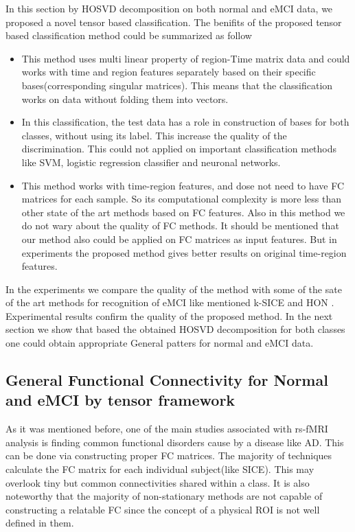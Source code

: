 \documentclass[preprint,12pt]{elsarticle}
\begin{document}
In this section by HOSVD decomposition on both normal and eMCI data, we proposed a novel tensor based classification. The benifits of the proposed tensor based classification method could be summarized as follow
\begin{itemize}
	\item This method  uses multi linear property of region-Time matrix data and  could works with time and region features separately based on their specific bases(corresponding singular matrices). This means that the classification works on data without folding them into vectors.
	\item  In this classification,  the test data has a role in construction of bases for both classes, without using its label. This  increase the quality of the discrimination. This could not applied on important classification methods like SVM, logistic regression classifier and neuronal networks. 
	\item This method works with time-region features, and dose not need to have FC matrices for each sample. So
	its computational complexity is more less than other state of the art methods  based on FC features. Also in this method we do not wary about the quality of FC methods.	
	It should be mentioned that our method also could be applied on FC matrices as input features. But in experiments the proposed method gives better results on original time-region features.  
\end{itemize}
In the experiments we compare the quality of the method with some of the sate of the art methods for recognition of eMCI like mentioned k-SICE and HON .
Experimental results confirm the quality of the proposed method. In the next section we show that based the obtained HOSVD decomposition for both classes one could obtain appropriate General patters for normal and eMCI data.	
\subsection{General Functional Connectivity for Normal and eMCI by tensor framework} \label{FC_Construction}


As it was mentioned before, one of the main studies associated with rs-fMRI analysis is finding common functional disorders cause by a disease like AD. This can be done via constructing proper FC matrices. The majority of techniques calculate the FC matrix for each individual subject(like SICE). This may overlook tiny but common connectivities shared within a class. It is also noteworthy that the majority of non-stationary methods are not capable of constructing a relatable FC since the concept of a physical ROI is not well defined in them.    
\end{document}
